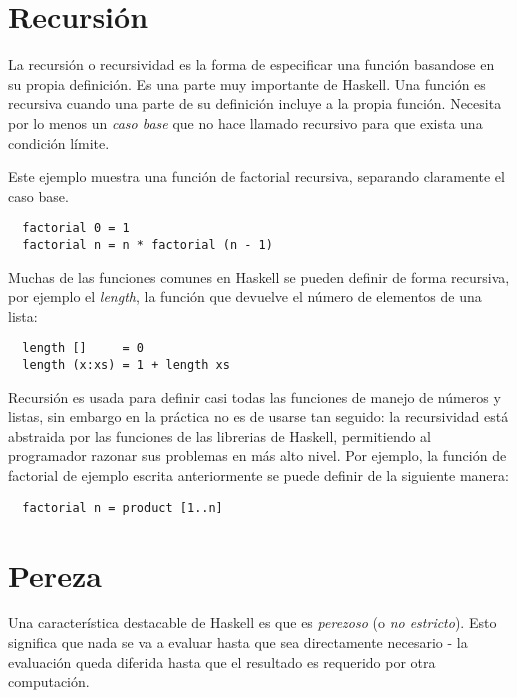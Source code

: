 \section{Recursión} %
\label{sec:recursi_n}

La recursión o recursividad es la forma de especificar una función basandose
en su propia definición. Es una parte muy importante de Haskell. Una función
es recursiva cuando una parte de su definición incluye a la propia función.
Necesita por lo menos un \textit{caso base} que no hace llamado recursivo para
que exista una condición límite.

Este ejemplo muestra una función de factorial recursiva, separando
claramente el caso base.

\begin{lstlisting}
  factorial 0 = 1
  factorial n = n * factorial (n - 1)
\end{lstlisting}

Muchas de las funciones comunes en Haskell se pueden definir de forma
recursiva, por ejemplo el \textit{length}, la función que devuelve el
número de elementos de una lista:

\begin{lstlisting}
  length []     = 0
  length (x:xs) = 1 + length xs
\end{lstlisting}

Recursión es usada para definir casi todas las funciones de manejo de números
y listas, sin embargo en la práctica no es de usarse tan seguido: la
recursividad está abstraida por las funciones de las librerias de Haskell,
permitiendo al programador razonar sus problemas en más alto nivel. Por
ejemplo, la función de factorial de ejemplo escrita anteriormente se puede
definir de la siguiente manera:

\begin{lstlisting}
  factorial n = product [1..n]
\end{lstlisting}



\section{Pereza} %
\label{sec:pereza}

Una característica destacable de Haskell es que es \textit{perezoso} (o
\textit{no estricto}). Esto significa que nada se va a evaluar hasta que sea
directamente necesario - la evaluación queda diferida hasta que el resultado
es requerido por otra computación.


